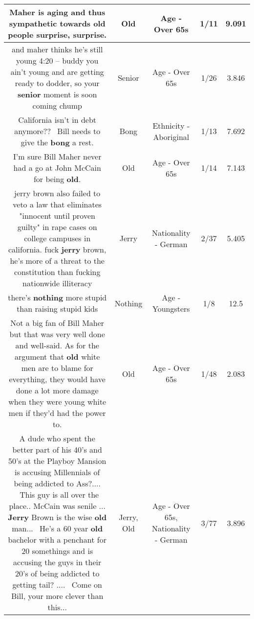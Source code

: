 \documentclass[11pt]{article}
\newlength\mylength
\begin{document}
\begin{center}
\begin{longtable}{|C{.65\mylength}|C{.30\mylength}|C{.12\mylength}|C{.12\mylength}|C{.12\mylength}|}
  \small Maher is aging and thus sympathetic towards \textbf{old} people surprise, surprise.\normalsize   & Old & Age - Over 65s & 1/11 & 9.091 \\  \hline
  \small and maher thinks he's still young 4:20 – buddy you ain't young and are getting ready to dodder, so your \textbf{senior} moment is soon coming chump\normalsize   & Senior & Age - Over 65s & 1/26 & 3.846 \\  \hline
  \small California isn't in debt anymore??  Bill needs to give the \textbf{bong} a rest.\normalsize   & Bong & Ethnicity - Aboriginal & 1/13 & 7.692 \\  \hline
  \small I'm sure Bill Maher never had a go at John McCain for being \textbf{old}.\normalsize   & Old & Age - Over 65s & 1/14 & 7.143 \\  \hline
  \small jerry brown also failed to veto a law that eliminates "innocent until proven guilty" in rape cases on college campuses in california. fuck \textbf{jerry} brown, he's more of a threat to the constitution than fucking nationwide illiteracy\normalsize   & Jerry & Nationality - German & 2/37 & 5.405 \\  \hline
  \small there's \textbf{nothing} more stupid than raising stupid kids\normalsize   & Nothing & Age - Youngsters & 1/8 & 12.5 \\  \hline
  \small Not a big fan of Bill Maher but that was very well done and well-said. As for the argument that \textbf{old} white men are to blame for everything, they would have done a lot more damage when they were young white men if they'd had the power to.\normalsize   & Old & Age - Over 65s & 1/48 & 2.083 \\  \hline
  \small A dude who spent the better part of his 40's and 50's at the Playboy Mansion is accusing Millennials of being addicted to Ass?....  This guy is all over the place.. McCain was senile ... \textbf{Jerry} Brown is the wise \textbf{old} man...  He's a 60 year \textbf{old} bachelor with a penchant for 20 somethings and is accusing the guys in their 20's of being addicted to getting tail? ....  Come on Bill, your more clever than this...\normalsize   & Jerry, Old & Age - Over 65s, Nationality - German & 3/77 & 3.896 \\  \hline

\end{longtable}
\end{center}
\end{document}
